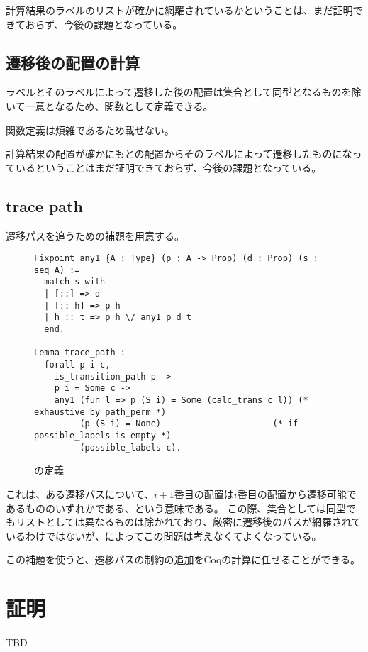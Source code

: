 計算結果のラベルのリストが確かに網羅されているかということは、まだ証明できておらず、今後の課題となっている。

\subsection{遷移後の配置の計算}

ラベルとそのラベルによって遷移した後の配置は集合として同型となるものを除いて一意となるため、関数として定義できる。

関数定義は煩雑であるため載せない。

計算結果の配置が確かにもとの配置からそのラベルによって遷移したものになっているということはまだ証明できておらず、今後の課題となっている。

\subsection{trace path}

遷移パスを追うための補題を用意する。

\begin{figure}
\begin{lstlisting}
Fixpoint any1 {A : Type} (p : A -> Prop) (d : Prop) (s : seq A) :=
  match s with
  | [::] => d
  | [:: h] => p h
  | h :: t => p h \/ any1 p d t
  end.

Lemma trace_path :
  forall p i c,
    is_transition_path p ->
    p i = Some c ->
    any1 (fun l => p (S i) = Some (calc_trans c l)) (* exhaustive by path_perm *)
         (p (S i) = None)                      (* if possible_labels is empty *)
         (possible_labels c).
\end{lstlisting}
\label{code:proof:trace-path}
\caption{の定義}
\end{figure}

これは、ある遷移パスについて、$i + 1$番目の配置は$i$番目の配置から遷移可能であるもののいずれかである、という意味である。
この際、集合としては同型でもリストとしては異なるものは除かれており、厳密に遷移後のパスが網羅されているわけではないが、によってこの問題は考えなくてよくなっている。

この補題を使うと、遷移パスの制約の追加をCoqの計算に任せることができる。

\section{証明}

TBD

